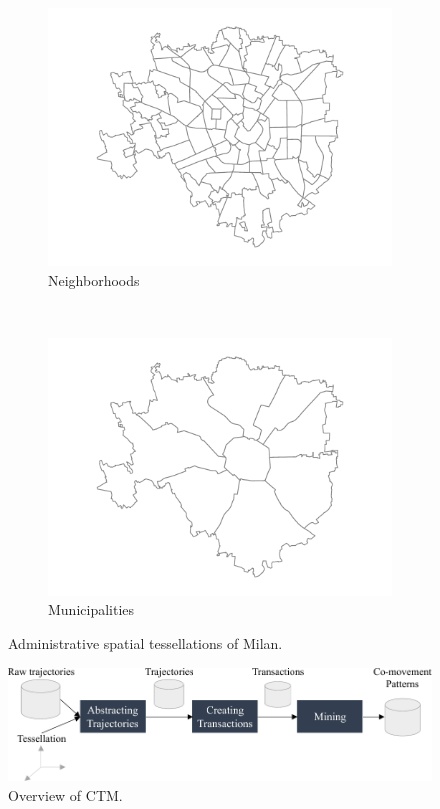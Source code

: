 \documentclass[preprint,12pt,authoryear]{elsarticle} %
\begin{document}
\begin{figure}[t]
    \begin{subfigure}[t]{.49\columnwidth}
        \centering
        \includegraphics[width=.8\textwidth]{milan-nil.pdf} %
        \caption{Neighborhoods}
        \label{fig:milnil}
    \end{subfigure}~
    \begin{subfigure}[t]{.49\columnwidth}
        \centering
        \includegraphics[width=.8\textwidth]{milan-munic.pdf} %
        \caption{Municipalities}
        \label{fig:milmun}
    \end{subfigure}
    \caption{Administrative spatial tessellations of Milan.}
    \label{fig:multilevtess}
\end{figure}

\begin{figure}[t]
    \centering
    \includegraphics[scale=.7]{overview.pdf}
    \caption{Overview of CTM.}
    \label{fig:overview}
\end{figure}
\end{document}
